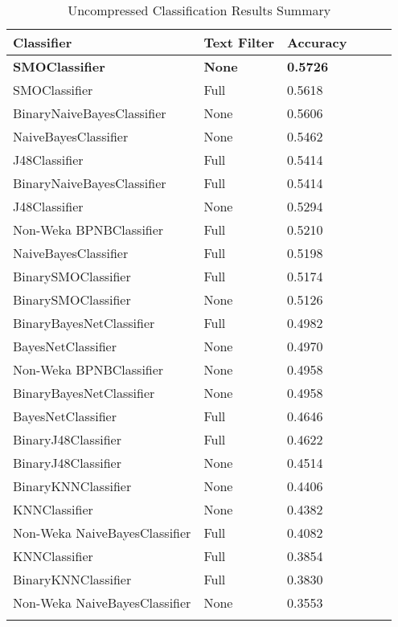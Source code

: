\begin{center}
   \begin{longtable}{|l|l|l|c|c|c|}
      \hline
         Classifier & Text Filter & Accuracy
      \tabularnewline\hline
         \textbf{SMOClassifier} & \textbf{None} & \textbf{0.5726}
      \tabularnewline\hline
         SMOClassifier & Full & 0.5618
      \tabularnewline\hline
         BinaryNaiveBayesClassifier & None & 0.5606
      \tabularnewline\hline
         NaiveBayesClassifier & None & 0.5462
      \tabularnewline\hline
         J48Classifier & Full & 0.5414
      \tabularnewline\hline
         BinaryNaiveBayesClassifier & Full & 0.5414
      \tabularnewline\hline
         J48Classifier & None & 0.5294
      \tabularnewline\hline
         Non-Weka BPNBClassifier & Full & 0.5210
      \tabularnewline\hline
         NaiveBayesClassifier & Full & 0.5198
      \tabularnewline\hline
         BinarySMOClassifier & Full & 0.5174
      \tabularnewline\hline
         BinarySMOClassifier & None & 0.5126
      \tabularnewline\hline
         BinaryBayesNetClassifier & Full & 0.4982
      \tabularnewline\hline
         BayesNetClassifier & None & 0.4970
      \tabularnewline\hline
         Non-Weka BPNBClassifier & None & 0.4958
      \tabularnewline\hline
         BinaryBayesNetClassifier & None & 0.4958
      \tabularnewline\hline
         BayesNetClassifier & Full & 0.4646
      \tabularnewline\hline
         BinaryJ48Classifier & Full & 0.4622
      \tabularnewline\hline
         BinaryJ48Classifier & None & 0.4514
      \tabularnewline\hline
         BinaryKNNClassifier & None & 0.4406
      \tabularnewline\hline
         KNNClassifier & None & 0.4382
      \tabularnewline\hline
         Non-Weka NaiveBayesClassifier & Full & 0.4082
      \tabularnewline\hline
         KNNClassifier & Full & 0.3854
      \tabularnewline\hline
         BinaryKNNClassifier & Full & 0.3830
      \tabularnewline\hline
         Non-Weka NaiveBayesClassifier & None & 0.3553
      \tabularnewline\hline
      \caption[Uncompressed Classification Results Summary]{Uncompressed Classification Results Summary}
      \label{table:classification-summary-uncompressed}
   \end{longtable}
\end{center}

